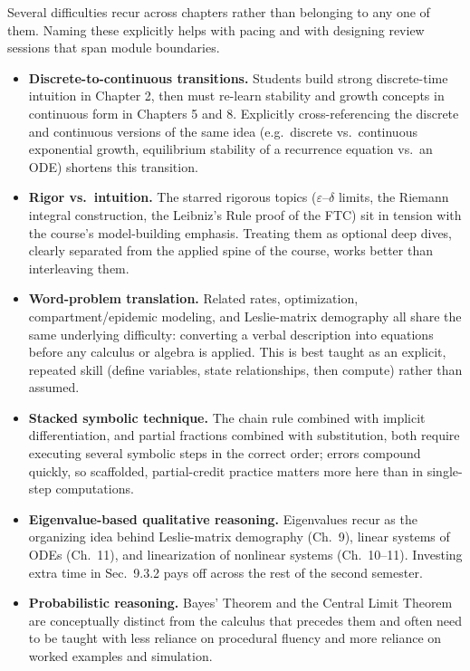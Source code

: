 \documentclass[11pt]{article}
\begin{document}
Several difficulties recur across chapters rather than belonging to any one
of them. Naming these explicitly helps with pacing and with designing
review sessions that span module boundaries.

\begin{itemize}
\item \textbf{Discrete-to-continuous transitions.} Students build strong
discrete-time intuition in Chapter 2, then must re-learn stability and
growth concepts in continuous form in Chapters 5 and 8. Explicitly
cross-referencing the discrete and continuous versions of the same idea
(e.g.\ discrete vs.\ continuous exponential growth, equilibrium stability
of a recurrence equation vs.\ an ODE) shortens this transition.
\item \textbf{Rigor vs.\ intuition.} The starred rigorous topics
($\varepsilon$--$\delta$ limits, the Riemann integral construction, the
Leibniz's Rule proof of the FTC) sit in tension with the course's
model-building emphasis. Treating them as optional deep dives, clearly
separated from the applied spine of the course, works better than
interleaving them.
\item \textbf{Word-problem translation.} Related rates, optimization,
compartment/epidemic modeling, and Leslie-matrix demography all share the
same underlying difficulty: converting a verbal description into equations
before any calculus or algebra is applied. This is best taught as an
explicit, repeated skill (define variables, state relationships, then
compute) rather than assumed.
\item \textbf{Stacked symbolic technique.} The chain rule combined with
implicit differentiation, and partial fractions combined with
substitution, both require executing several symbolic steps in the correct
order; errors compound quickly, so scaffolded, partial-credit practice
matters more here than in single-step computations.
\item \textbf{Eigenvalue-based qualitative reasoning.} Eigenvalues recur as
the organizing idea behind Leslie-matrix demography (Ch.\ 9), linear
systems of ODEs (Ch.\ 11), and linearization of nonlinear systems (Ch.\
10--11). Investing extra time in Sec.\ 9.3.2 pays off across the rest of
the second semester.
\item \textbf{Probabilistic reasoning.} Bayes' Theorem and the Central
Limit Theorem are conceptually distinct from the calculus that precedes
them and often need to be taught with less reliance on procedural fluency
and more reliance on worked examples and simulation.
\end{itemize}
\end{document}
